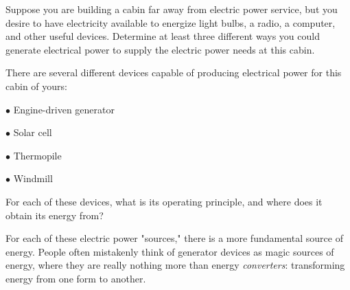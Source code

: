 

Suppose you are building a cabin far away from electric power service, but you desire to have electricity available to energize light bulbs, a radio, a computer, and other useful devices.  Determine at least three different ways you could generate electrical power to supply the electric power needs at this cabin.







There are several different devices capable of producing electrical power for this cabin of yours:

\medskip
\item{$\bullet$} Engine-driven generator
\item{$\bullet$} Solar cell
\item{$\bullet$} Thermopile
\item{$\bullet$} Windmill
\medskip

For each of these devices, what is its operating principle, and where does it obtain its energy from?







For each of these electric power "sources," there is a more fundamental source of energy.  People often mistakenly think of generator devices as magic sources of energy, where they are really nothing more than energy {\it converters}: transforming energy from one form to another.




